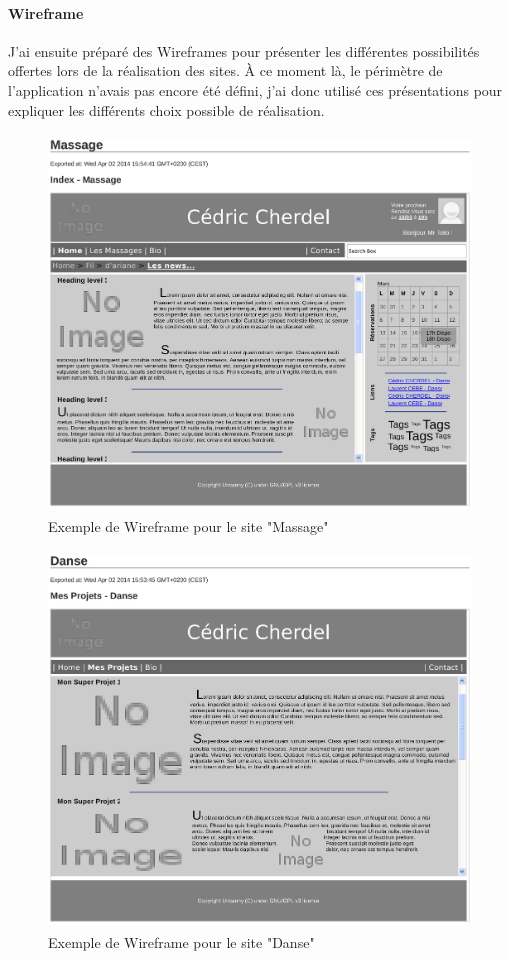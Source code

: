 \documentclass[11pt,a4paper]{report}
\begin{document}
			\paragraph*{Wireframe}J'ai ensuite préparé des Wireframes pour présenter les différentes possibilités offertes lors de la réalisation des sites. À ce moment là, le périmètre de l'application n'avais pas encore été défini, j'ai donc utilisé ces présentations pour expliquer les différents choix possible de réalisation.

				\begin{figure}[H]
					\centering
					\includegraphics[height=10cm]{Wireframe-Massage_1.eps}
					\caption{Exemple de Wireframe pour le site "Massage"}
					\label{fig:Wireframe Massage}
				\end{figure}
				\begin{figure}[H]
					\centering
					\includegraphics[height=10cm]{Wireframe-Danse_1.eps}
					\caption{Exemple de Wireframe pour le site "Danse"}
					\label{fig:Wireframe Danse}
				\end{figure}
\end{document}
